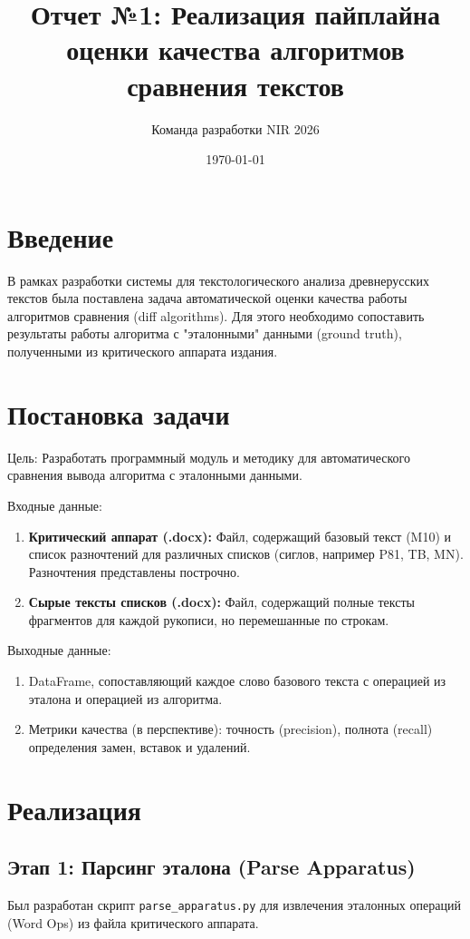 \documentclass[12pt,a4paper]{article}
\title{Отчет №1: Реализация пайплайна оценки качества алгоритмов сравнения текстов}
\author{Команда разработки NIR 2026}
\date{\today}
\begin{document}
\maketitle

\tableofcontents
\newpage

\section{Введение}
В рамках разработки системы для текстологического анализа древнерусских текстов была поставлена задача автоматической оценки качества работы алгоритмов сравнения (diff algorithms). Для этого необходимо сопоставить результаты работы алгоритма с "эталонными" данными (ground truth), полученными из критического аппарата издания.

\section{Постановка задачи}
Цель: Разработать программный модуль и методику для автоматического сравнения вывода алгоритма с эталонными данными.

Входные данные:
\begin{enumerate}
    \item \textbf{Критический аппарат (.docx):} Файл, содержащий базовый текст (M10) и список разночтений для различных списков (сиглов, например P81, TB, MN). Разночтения представлены построчно.
    \item \textbf{Сырые тексты списков (.docx):} Файл, содержащий полные тексты фрагментов для каждой рукописи, но перемешанные по строкам.
\end{enumerate}

Выходные данные:
\begin{enumerate}
    \item DataFrame, сопоставляющий каждое слово базового текста с операцией из эталона и операцией из алгоритма.
    \item Метрики качества (в перспективе): точность (precision), полнота (recall) определения замен, вставок и удалений.
\end{enumerate}

\section{Реализация}

\subsection{Этап 1: Парсинг эталона (Parse Apparatus)}
Был разработан скрипт \texttt{parse\_apparatus.py} для извлечения эталонных операций (Word Ops) из файла критического аппарата.
\end{document}
